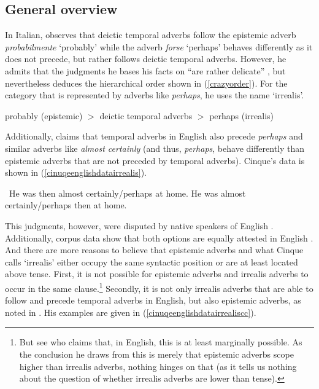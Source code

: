 \subsection{General overview}
In Italian, \citet[86--89]{cinque1999adverbs} observes that deictic temporal adverbs follow the epistemic adverb \textit{probabilmente} `probably' while the adverb \textit{forse} `perhaps' behaves differently as it does not precede, but rather follows deictic temporal adverbs. However, he admits that the judgments he bases his facts on ``are rather delicate'' \citep[87]{cinque1999adverbs}, but nevertheless deduces the hierarchical order shown in (\ref{crazyorder}). For the category that is represented by adverbs like \textit{perhaps}, he uses the name `irrealis'.

\begin{exe} 
\ex probably (epistemic) $>$ deictic temporal adverbs $>$ perhaps (irrealis) \label{crazyorder}
\end{exe}  

\noindent Additionally, \citet[33]{cinque1999adverbs} claims that temporal adverbs in English also precede \textit{perhaps} and similar adverbs like \textit{almost certainly} (and thus, \textit{perhaps}, behave differently than epistemic adverbs that are not preceded by temporal adverbs). Cinque's data is shown in (\ref{cinuqeenglishdatairrealis}).

\begin{exe}
\ex\label{cinuqeenglishdatairrealis}\begin{xlist}
\ex \textcolor{white}{*}He was then almost certainly/perhaps at home.
\ex *He was almost certainly/perhaps then at home.
\end{xlist}
\end{exe}

\noindent This judgments, however, were disputed by native speakers of English \citep[32]{zyman2012two}. Additionally, corpus data show that both options are equally attested in English \citep[65--66]{nordstrom2010modality}. And there are more reasons to believe that epistemic adverbs and what Cinque calls `irrealis' either occupy the same syntactic position or are at least located above tense. First, it is not possible for epistemic adverbs and irrealis adverbs to occur in the same clause.\footnote{ But see \citet[32]{zyman2012two} who claims that, in English, this is at least marginally possible. As the conclusion he draws from this is merely that epistemic adverbs scope higher than irrealis adverbs, nothing hinges on that (as it tells us nothing about the question of whether irrealis adverbs are lower than tense). } Secondly, it is not only irrealis adverbs that are able to follow and precede temporal adverbs in English, but also epistemic adverbs, as noted in \citet[33]{cinque1999adverbs}. His examples are given in (\ref{cinuqeenglishdatairrealiscc}).

